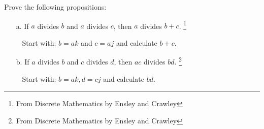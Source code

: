         \begin{questionNOGRADE}{\thequestion}
            Prove the following propositions:

            \begin{enumerate}
                \item[a.] If $a$ divides $b$ and $a$ divides $c$, then $a$ divides $b + c$.
                    \footnote{From Discrete Mathematics by Ensley and Crawley}

                    \begin{hint}{\ }
                        Start with: $b = ak$ and $c = aj$ and calculate $b+c$.
                    \end{hint}

                \item[b.] If $a$ divides $b$ and $c$ divides $d$, then $ac$ divides $bd$.
                    \footnote{From Discrete Mathematics by Ensley and Crawley}

                    \begin{hint}{\ }
                        Start with: $b = ak, d = cj$ and calculate $bd$.
                    \end{hint}

            \end{enumerate}
        \end{questionNOGRADE}



